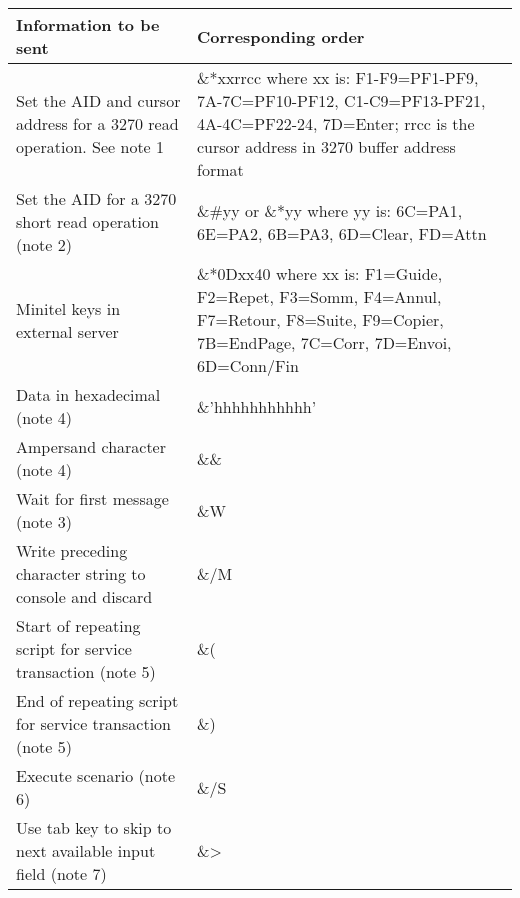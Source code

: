 \documentclass[letterpaper,10pt,english]{sphinxmanual}
\begin{document}
\begin{savenotes}\sphinxattablestart
\centering
\begin{tabulary}{\linewidth}[t]{|T|T|}
\hline
\sphinxstyletheadfamily 
Information to be sent
&\sphinxstyletheadfamily 
Corresponding order
\\
\hline
Set the AID and cursor address for a 3270
read operation. See note 1
&
\&*xxrrcc where xx is:
F1-F9=PF1-PF9, 7A-7C=PF10-PF12, C1-C9=PF13-PF21, 4A-4C=PF22-24, 7D=Enter;
rrcc is the cursor address in 3270 buffer address format
\\
\hline
Set the AID for a 3270 short read operation (note 2)
&
\&\#yy or \&*yy where yy is:
6C=PA1, 6E=PA2, 6B=PA3,
6D=Clear, FD=Attn
\\
\hline
Minitel keys in external server
&
\&*0Dxx40 where xx is:
F1=Guide, F2=Repet, F3=Somm, F4=Annul, F7=Retour, F8=Suite, F9=Copier,
7B=EndPage, 7C=Corr, 7D=Envoi, 6D=Conn/Fin
\\
\hline
Data in hexadecimal (note 4)
&
\&’hhhhhhhhhhh’
\\
\hline
Ampersand character (note 4)
&
\&\&
\\
\hline
Wait for first message (note 3)
&
\&W
\\
\hline
Write preceding character string to console and discard
&
\&/M
\\
\hline
Start of repeating script for service transaction (note 5)
&
\&(
\\
\hline
End of repeating script for service transaction (note 5)
&
\&)
\\
\hline
Execute scenario (note 6)
&
\&/S
\\
\hline
Use tab key to skip to next available input field (note 7)
&
\&\textgreater{}
\\
\hline
\end{tabulary}
\par
\sphinxattableend\end{savenotes}
\end{document}

